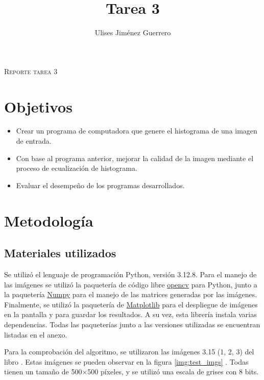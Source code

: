 \documentclass[12pt]{article}
\title{Tarea 3}
\author{Ulises Jiménez Guerrero}
\begin{document}


\begin{center}
	\Large
		{\scshape Reporte tarea 3}
\end{center}

\section{Objetivos}
\begin{itemize}
	\item Crear un programa de computadora que genere el histograma de una imagen de entrada.
	
	\item Con base al programa anterior, mejorar la calidad de la imagen mediante el proceso de ecualización de histograma.
	
	\item Evaluar el desempeño de los programas desarrollados.
\end{itemize}
 
 
\section{Metodología}
\subsection{Materiales utilizados}
Se utilizó el lenguaje de programación Python, versión 3.12.8. Para el manejo de las imágenes se utilizó la paquetería de código libre \href{https://pypi.org/project/opencv-python/}{opencv} para Python, junto a la paquetería \href{https://pypi.org/project/numpy/}{Numpy} para el manejo de las matrices generadas por las imágenes. Finalmente, se utilizó la paquetería de \href{https://pypi.org/project/matplotlib/}{Matplotlib} para el despliegue de imágenes en la pantalla y para guardar los resultados. A su vez, esta librería instala varias dependencias. Todas las paqueterías junto a las versiones utilizadas se encuentran listadas en el anexo. 

Para la comprobación del algoritmo, se utilizaron las imágenes 3.15 (1, 2, 3) del libro
\cite{gonzalezDigitalImageProcessing2017}
. Estas imágenes se pueden observar en la figura
\ref{img:test_imgs}
. Todas tienen un tamaño de 500$\times$500 píxeles, y se utilizó una escala de grises con 8 bits.
\end{document}
